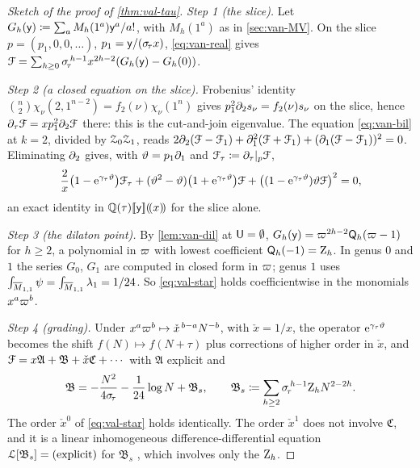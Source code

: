 \begin{proof}[Sketch of the proof of \cref{thm:val-tau}]
\emph{Step 1 (the slice).} Let $G_h(\mathsf{y})\coloneqq\sum_aM_h(1^a)\mathsf{y}^a/a!$, with $M_h(1^a)$ as in \cref{sec:van-MV}. On the slice $p=(p_1,0,0,\dots)$, $p_1=\mathsf{y}/(\sigma_{\!\tau} x)$, \eqref{eq:van-real} gives $\mathcal{F}=\sum_{h\geq 0}\sigma_{\!\tau}^{\,h-1}x^{2h-2}(G_h(\mathsf{y})-G_h(0))$.

\emph{Step 2 (a closed equation on the slice).} Frobenius' identity $\binom{n}{2}\chi_\nu(2,1^{n-2})=f_2(\nu)\chi_\nu(1^n)$ gives $p_1^2\partial_2s_\nu=f_2(\nu)s_\nu$ on the slice, hence $\partial_\tau\mathcal{F}=xp_1^2\partial_2\mathcal{F}$ there: this is the cut-and-join eigenvalue. The equation \eqref{eq:van-bil} at $k=2$, divided by $\mathcal{Z}_0\mathcal{Z}_1$, reads $2\partial_2(\mathcal{F}-\mathcal{F}_1)+\partial_1^2(\mathcal{F}+\mathcal{F}_1)+(\partial_1(\mathcal{F}-\mathcal{F}_1))^2=0$. Eliminating $\partial_2$ gives, with $\vartheta=p_1\partial_1$ and $\mathcal{F}_\tau\coloneqq\partial_\tau|_p\mathcal{F}$,
\begin{equation}\label{eq:val-star}
\frac{2}{x}\bigl(1-\mathrm{e}^{\gamma_\tau\vartheta}\bigr)\mathcal{F}_\tau+(\vartheta^2-\vartheta)\bigl(1+\mathrm{e}^{\gamma_\tau\vartheta}\bigr)\mathcal{F}+\bigl((1-\mathrm{e}^{\gamma_\tau\vartheta})\vartheta\mathcal{F}\bigr)^2=0,
\end{equation}
an exact identity in $\mathbb{Q}(\tau)[\![ \mathsf{y} ]\!](\!(x)\!)$ for the slice alone.

\emph{Step 3 (the dilaton point).} By \cref{lem:van-dil} at $\mathsf{U}=\emptyset$, $G_h(\mathsf{y})=\varpi^{2h-2}\mathsf{Q}_h(\varpi-1)$ for $h\geq2$, a polynomial in $\varpi$ with lowest coefficient $\mathsf{Q}_h(-1)=\mathrm{Z}_h$. In genus $0$ and $1$ the series $G_0$, $G_1$ are computed in closed form in $\varpi$; genus $1$ uses $\int_{\overline{M}_{1,1}}\psi=\int_{\overline{M}_{1,1}}\lambda_1=1/24$. So \eqref{eq:val-star} holds coefficientwise in the monomials $x^a\varpi^b$.

\emph{Step 4 (grading).} Under $x^a\varpi^b\mapsto\check{x}^{\,b-a}N^{-b}$, with $\check{x}=1/x$, the operator $\mathrm{e}^{\gamma_\tau\vartheta}$ becomes the shift $f(N)\mapsto f(N+\tau)$ plus corrections of higher order in $\check{x}$, and $\mathcal{F}=x\mathfrak{A}+\mathfrak{B}+\check{x}\mathfrak{C}+\cdots$ with $\mathfrak{A}$ explicit and
\[
\mathfrak{B}=-\frac{N^2}{4\sigma_{\!\tau}}-\frac{1}{24}\log N+\mathfrak{B}_s,\qquad\mathfrak{B}_s\coloneqq\sum_{h\geq 2}\sigma_{\!\tau}^{\,h-1}\mathrm{Z}_hN^{2-2h}.
\]
The order $\check{x}^0$ of \eqref{eq:val-star} holds identically. The order $\check{x}^1$ does not involve $\mathfrak{C}$, and it is a linear inhomogeneous difference-differential equation $\mathcal{L}[\mathfrak{B}_s]=(\text{explicit})$ for $\mathfrak{B}_s$ , which involves only the $\mathrm{Z}_h$.


\end{proof}
